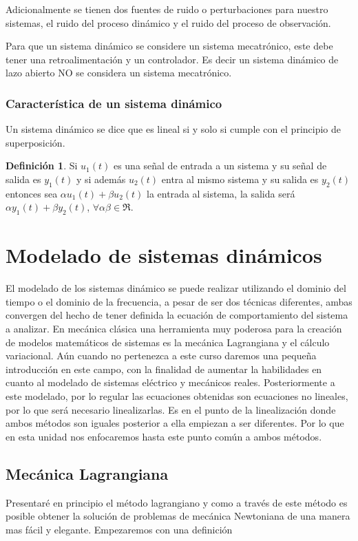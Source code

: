 \documentclass[12pt]{book}
\theoremstyle{definition}
\newtheorem{dfn}{Definición}[section]
\theoremstyle{remark}
\theoremstyle{plain}
\begin{document}
Adicionalmente se tienen dos fuentes de ruido o perturbaciones para nuestro sistemas, el ruido del proceso dinámico y el ruido del proceso de observación.

Para que un sistema dinámico se considere un sistema mecatrónico, este debe tener una retroalimentación y un controlador. Es decir un sistema dinámico de lazo abierto NO se considera un sistema mecatrónico.

\subsection{Característica de un sistema dinámico}

Un sistema dinámico se dice que es lineal si y solo si cumple con el principio de superposición.

\begin{dfn}
\label{def1}
Si $u_1(t)$ es una señal de entrada a un sistema y su señal de salida es $y_1(t)$ y si además $u_2 (t)$ entra al mismo sistema y su salida es $y_2 (t)$ entonces sea $\alpha u_1(t)+ \beta u_2 (t)$ la entrada al sistema, la salida será $\alpha y_1 (t)+ \beta y_2 (t)$, $\forall \alpha \beta \in \Re$.
\end{dfn}



\chapter{Modelado de sistemas dinámicos}

El modelado de los sistemas dinámico se puede realizar utilizando el dominio del tiempo o el dominio de la frecuencia, a pesar de ser dos técnicas diferentes, ambas 
convergen del hecho de tener definida la ecuación de comportamiento del sistema a analizar. En mecánica clásica una herramienta muy poderosa para la creación de modelos 
matemáticos de sistemas es la mecánica Lagrangiana y el cálculo variacional. Aún cuando no pertenezca a este curso daremos una pequeña introducción en este campo, 
con la finalidad de aumentar la habilidades en cuanto al modelado de sistemas eléctrico y mecánicos reales. Posteriormente a este modelado, por lo regular las ecuaciones 
obtenidas son ecuaciones no lineales, por lo que será necesario linealizarlas. Es en el punto de la linealización donde ambos métodos son iguales posterior a ella 
empiezan a ser diferentes. Por lo que en esta unidad nos enfocaremos hasta este punto común a ambos métodos.

\section{Mecánica Lagrangiana}
Presentaré en principio el método lagrangiano y como a través de este método es posible obtener la solución de problemas de mecánica Newtoniana de una manera mas fácil y elegante. Empezaremos con una definición
\end{document}
